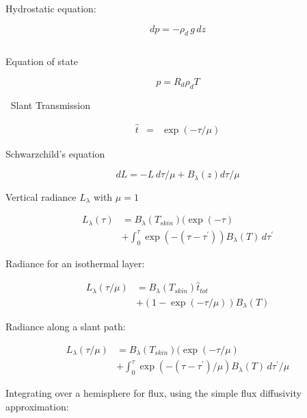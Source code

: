 \documentclass[12pt]{article}
\begin{document}
\begin{multicols}{2}
$~$

\noindent
Hydrostatic equation:

\begin{equation}
  \label{eq:hydro}
  dp = -\rho_d\, g\, dz
\end{equation}

$~$

\noindent
Equation of state

\begin{equation}
  \label{eq:state}
  p = R_d \rho_d T
\end{equation}


$~$
\noindent
Slant Transmission 

\begin{eqnarray}
\hat{t}  &=& \exp ( - \tau/\mu ) 
\end{eqnarray}
$~$

\noindent
Schwarzchild's equation

\begin{equation}
  \label{eq:schwarz}
  dL = -L\, d\tau/\mu  + B_{\lambda}(z) d\tau/\mu
\end{equation}
$~$

\noindent
Vertical radiance $L_\lambda$  with $\mu = 1$

\begin{align}
  L_\lambda(\tau)&= B_\lambda(T_{skin})( \exp(-\tau)  \nonumber \\
  &+    \int_0^{\tau} \exp\left(  - (\tau -\tau^\prime) \right )
     B_\lambda(T)\, d\tau^\prime 
\end{align}


Radiance for an isothermal layer:

\begin{align}
  L_\lambda(\tau/\mu)&= B_\lambda(T_{skin}) \hat{t}_{tot} \nonumber\\
             &+  (1 - \exp(-\tau/\mu) )B_\lambda(T)
\end{align}



\noindent
Radiance along a slant path:

\begin{align}
  L_\lambda(\tau/\mu) &= B_\lambda(T_{skin})( \exp(-\tau/\mu) \nonumber \\
  &+  \int_0^{\tau} \exp\left(  - (\tau -\tau^\prime)/\mu \right )
     B_\lambda(T)\, d\tau^\prime/\mu 
\end{align}

    
\noindent
Integrating over a hemisphere for flux, using the simple flux diffusivity approximation:


\end{multicols}
\end{document}
